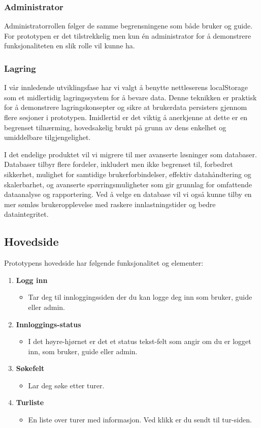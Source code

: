 \documentclass[../doc]{subfiles}
\begin{document}
\subsubsection*{Administrator}
Administratorrollen følger de samme begrensningene som både bruker og guide. For prototypen er det tilstrekkelig men kun én administrator for å demonstrere funksjonaliteten en slik rolle vil kunne ha.

\subsubsection*{Lagring}
I vår innledende utviklingsfase har vi valgt å benytte nettleserens localStorage som et midlertidig lagringssystem for å bevare data. Denne teknikken er praktisk for å demonstrere lagringskonsepter og sikre at brukerdata persisters gjennom flere sesjoner i prototypen. Imidlertid er det viktig å anerkjenne at dette er en begrenset tilnærming, hovedsakelig brukt på grunn av dens enkelhet og umiddelbare tilgjengelighet.

I det endelige produktet vil vi migrere til mer avanserte løsninger som databaser. Databaser tilbyr flere fordeler, inkludert men ikke begrenset til, forbedret sikkerhet, mulighet for samtidige brukerforbindelser, effektiv datahåndtering og skalerbarhet, og avanserte spørringsmuligheter som gir grunnlag for omfattende dataanalyse og rapportering. Ved å velge en database vil vi også kunne tilby en mer sømløs brukeropplevelse med raskere innlastningstider og bedre dataintegritet.
\subsection{Hovedside}
Prototypens hovedside har følgende funksjonalitet og elementer:

\begin{enumerate}
    \item \textbf{Logg inn}
    \begin{itemize}
        \item Tar deg til innloggingssiden der du kan logge deg inn som bruker, guide eller admin.
    \end{itemize}

    \item \textbf{Innloggings-status}
    \begin{itemize}
        \item I det høyre-hjørnet er det et status tekst-felt som angir om du er logget inn, som bruker, guide eller admin.
    \end{itemize}

    \item \textbf{Søkefelt}
    \begin{itemize}
        \item Lar deg søke etter turer.
    \end{itemize}

    \item \textbf{Turliste}
    \begin{itemize}
        \item En liste over turer med informasjon. Ved klikk er du sendt til tur-siden.
    \end{itemize}
\end{enumerate}
\end{document}
